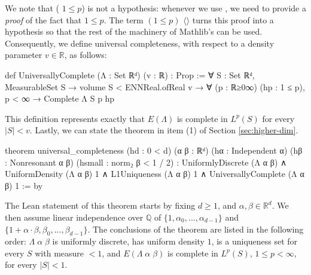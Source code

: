 \documentclass[reqno,a4paper,12pt]{amsart}
\numberwithin{equation}{section}
\newcommand\1{\mathds{1}}
\providecommand{\lean}[1]{\texttt{\detokenize{#1}}}
\begin{document}
We note that (\lean{hp :} $1\le p$) is not a hypothesis: whenever we use \lean{Complete}, we need to provide a \textit{proof} of the fact that $1\leq p$. The term \lean{letI : Fact} $(1 \le p)$ \lean{:=} $\langle$\lean{hp}$\rangle$ turns this proof into a hypothesis so that the rest of the machinery of Mathlib's \lean{Lp} can be used. 
Consequently, we define universal completeness, with respect to a density parameter $v\in \mathbb R$, as follows:
\begin{leancode}
    def UniversallyComplete (Λ : Set ℝᵈ) (v : ℝ) : Prop :=
      ∀ S : Set ℝᵈ, MeasurableSet S → volume S < ENNReal.ofReal v →
        ∀ (p : ℝ≥0∞) (hp : 1 ≤ p), p < ∞ → Complete Λ S p hp
\end{leancode}
This definition represents exactly that $E(\Lambda)$ is complete in $L^p(S)$ for every $|S|<v$.  
Lastly, we can state the theorem in item (1) of Section \ref{sec:higher-dim}.
\begin{leancode}
    theorem universal_completeness
      (hd : 0 < d) (α β : ℝᵈ)     
      (hα : Independent α) (hβ : Nonresonant α β) (hsmall : norm₂ β < 1 / 2) :
      UniformlyDiscrete (Λ α β) ∧
      UniformDensity (Λ α β) 1 ∧
      L1Uniqueness (Λ α β) 1 ∧
      UniversallyComplete (Λ α β) 1 := by
\end{leancode}
The Lean statement of this theorem starts by fixing $d\geq 1$, and $\alpha, \beta\in\mathbb R^d$. We then assume linear independence over $\mathbb Q$ of $\lbrace 1, \alpha_0, ..., \alpha_{d-1}\rbrace$ and  $\lbrace 1+\alpha\cdot\beta, \beta_0, ..., \beta_{d-1}\rbrace$. The conclusions of the theorem are listed in the following order: $\Lambda\; \alpha \;\beta$ is uniformly discrete, has uniform density $1$, is a uniqueness set for every $S$ with measure $<1$, and $E(\Lambda \;\alpha \;\beta)$ is complete in $L^p(S)$, $1\leq p <\infty$, for every $|S|<1$. 
\end{document}
